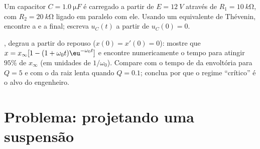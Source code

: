 \begin{exercise}[$\star\star\star$]\label{exo:b1:transient-regimes:11}
Um capacitor $C = \qty{1.0}{\micro F}$ é carregado a partir de $E = \qty{12}{V}$
através de $R_1 = \qty{10}{k\ohm}$, com $R_2 = \qty{20}{k\ohm}$ ligado
em paralelo com ele. Usando um equivalente de Thévenin, encontre a  e a
 final; escreva $u_C(t)$ a partir de $u_C(0) = 0$.
\end{exercise}

\begin{exercise}[$\star\star\star$]\label{exo:b1:transient-regimes:12}
, degrau a partir do repouso ($x(0) = x'(0) = 0$): mostre que
$x = x_\infty[1 - (1 + \omega_0 t)\eu^{-\omega_0 t}]$ e encontre
numericamente o tempo para atingir $95\%$ de $x_\infty$ (em unidades de
$1/\omega_0$). Compare com o tempo de  da envoltória para $Q = 5$
e com o da raiz lenta quando $Q = 0.1$; conclua por que o regime ``crítico'' é o
alvo do engenheiro.
\end{exercise}

\section{Problema: projetando uma suspensão}

